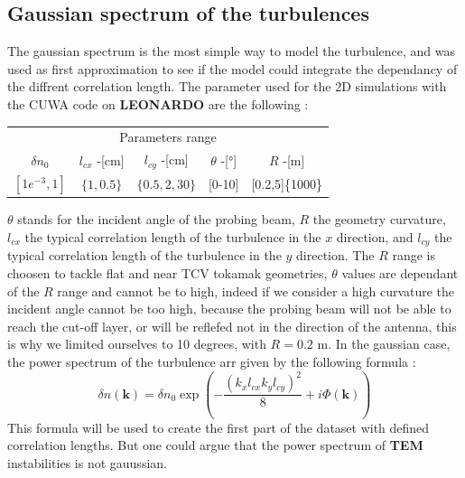 \documentclass[11pt,a4paper,openany]{report}
\begin{document}
\begin{multicols}{2}
    \subsection{Gaussian spectrum of the turbulences}
    The gaussian spectrum is the most simple way to model the turbulence, and was used as first approximation to see if the model could integrate the dependancy of the diffrent correlation length. The parameter used for the 2D simulations with the CUWA code on \textbf{LEONARDO} are the following :
    \setlength{\tabcolsep}{.016\linewidth}
    \begin{center}
        \begin{tabular}{ccccc}
            \toprule
            \multicolumn{5}{c}{Parameters range}                                                \\
            \cmidrule{1 -5}
            $\delta n_0$   & $l_{cx}$ -[cm] & $l_{cy}$ -[cm]  & $\theta$ -[°] & $R$ -[m]        \\
            \midrule
            $[1e^{-3}, 1]$ & $\{1, 0.5 \}$  & $\{0.5,2,30 \}$ & [0-10]        & [0.2,5]\{1000\} \\
            \bottomrule
        \end{tabular}
    \end{center}
    $\theta$ stands for the incident angle of the probing beam, $R$ the geometry curvature, $l_{cx}$ the typical correlation length of the turbulence in the $x$ direction, and $l_{cy}$ the typical correlation length of the turbulence in the $y$ direction. The $R$ range is choosen to tackle flat and near TCV tokamak geometries, $\theta$ values are dependant of the $R$ range and cannot be to high, indeed if we consider a high curvature the incident angle cannot be too high, because the probing beam will not be able to reach the cut-off layer, or will be reflefed not in the direction of the antenna, this is why we limited ourselves to 10 degrees, with $R = 0.2$ m. In the gaussian case, the power spectrum of the turbulence arr given by the following formula :
    $$\delta n(\textbf{k} ) = \delta n_0 \exp\left(-\frac{(k_x l_{cx} k_y l_{cy})^2}{8} + i\Phi(\textbf{k} )\right)$$
    This formula will be used to create the first part of the dataset with defined correlation lengths. But one could argue that the power spectrum of \textbf{TEM} instabilities is not gauussian.

\end{multicols}
\end{document}
